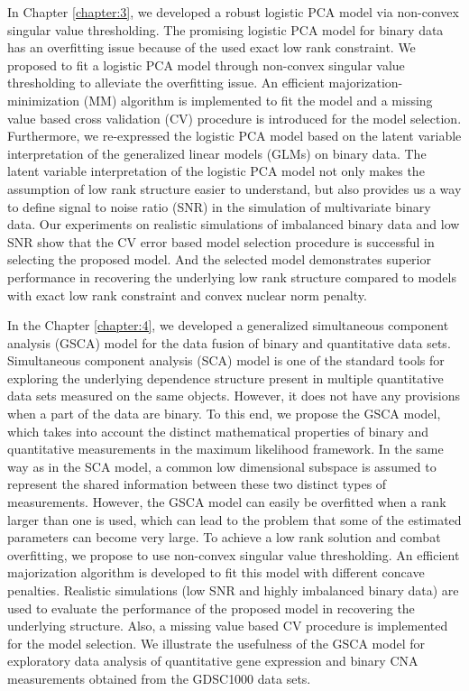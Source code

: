 In Chapter \ref{chapter:3}, we developed a robust logistic PCA model via non-convex singular value thresholding. The promising logistic PCA model for binary data has an overfitting issue because of the used exact low rank constraint. We proposed to fit a logistic PCA model through non-convex singular value thresholding to alleviate the overfitting issue. An efficient majorization-minimization (MM) algorithm is implemented to fit the model and a missing value based cross validation (CV) procedure is introduced for the model selection. Furthermore, we re-expressed the logistic PCA model based on the latent variable interpretation of the generalized linear models (GLMs) on binary data. The latent variable interpretation of the logistic PCA model not only makes the assumption of low rank structure easier to understand, but also provides us a way to define signal to noise ratio (SNR) in the simulation of multivariate binary data. Our experiments on realistic simulations of imbalanced binary data and low SNR show that the CV error based model selection procedure is successful in selecting the proposed model. And the selected model demonstrates superior performance in recovering the underlying low rank structure compared to models with exact low rank constraint and convex nuclear norm penalty.

In the Chapter \ref{chapter:4}, we developed a generalized simultaneous component analysis (GSCA) model for the data fusion of binary and quantitative data sets. Simultaneous component analysis (SCA) model is one of the standard tools for exploring the underlying dependence structure present in multiple quantitative data sets measured on the same objects. However, it does not have any provisions when a part of the data are binary. To this end, we propose the GSCA model, which takes into account the distinct mathematical properties of binary and quantitative measurements in the maximum likelihood framework. In the same way as in the SCA model, a common low dimensional subspace is assumed to represent the shared information between these two distinct types of measurements. However, the GSCA model can easily be overfitted when a rank larger than one is used, which can lead to the problem that some of the estimated parameters can become very large. To achieve a low rank solution and combat overfitting, we propose to use non-convex singular value thresholding. An efficient majorization algorithm is developed to fit this model with different concave penalties. Realistic simulations (low SNR and highly imbalanced binary data) are used to evaluate the performance of the proposed model in recovering the underlying structure. Also, a missing value based CV procedure is implemented for the model selection. We illustrate the usefulness of the GSCA model for exploratory data analysis of quantitative gene expression and binary CNA measurements obtained from the GDSC1000 data sets.

